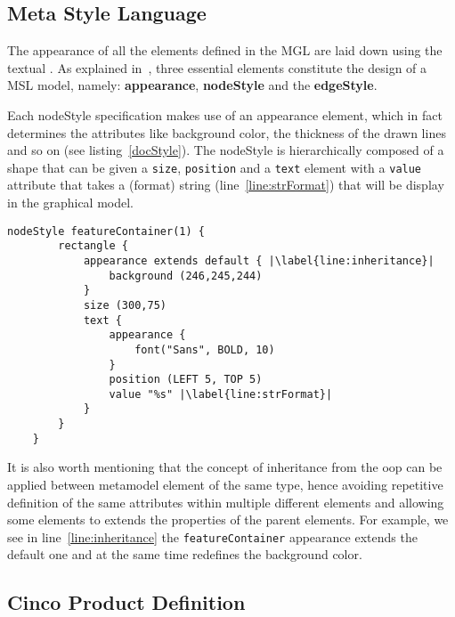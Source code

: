 \subsection{Meta Style Language}\label{sec:MSL}

The appearance of all the elements defined in the MGL are laid down using the textual . As explained in~\cite{gitlabcinco}, three essential elements constitute the design of a MSL model, namely: \textbf{appearance}, \textbf{nodeStyle} and the \textbf{edgeStyle}.

Each nodeStyle specification makes use of an appearance element, which in fact determines the attributes like background color, the thickness of the drawn lines and so on (see listing~\ref{docStyle}). The nodeStyle is hierarchically composed of a shape that can be given a \lstinline[language=MGL]{size}, \lstinline[language=MGL]{position} and a \lstinline[language=MGL]{text} element with a \lstinline[language=MGL]{value} attribute that takes a (format) string (line~\ref{line:strFormat}) that will be display in the graphical model.

\begin{lstlisting}[language=MGL, caption={Excerpt from feature.style to be applied to feature.mgl}, label=docStyle, escapechar=|, name=docMSL]
    nodeStyle featureContainer(1) {
        rectangle {
            appearance extends default { |\label{line:inheritance}|
                background (246,245,244)
            }
            size (300,75)
            text {
                appearance {
                    font("Sans", BOLD, 10)
                }
                position (LEFT 5, TOP 5)
                value "%s" |\label{line:strFormat}|
            }
        }
    }
\end{lstlisting}

It is also worth mentioning that the concept of inheritance from the \gls*{oop} can be applied between metamodel element of the same type, hence avoiding repetitive definition of the same attributes within multiple different elements and allowing some elements to extends the properties of the parent elements. For example, we see in line~\ref{line:inheritance} the \lstinline{featureContainer} appearance extends the default one and at the same time redefines the background color.

\subsection{Cinco Product Definition}\label{sec:CPD}

